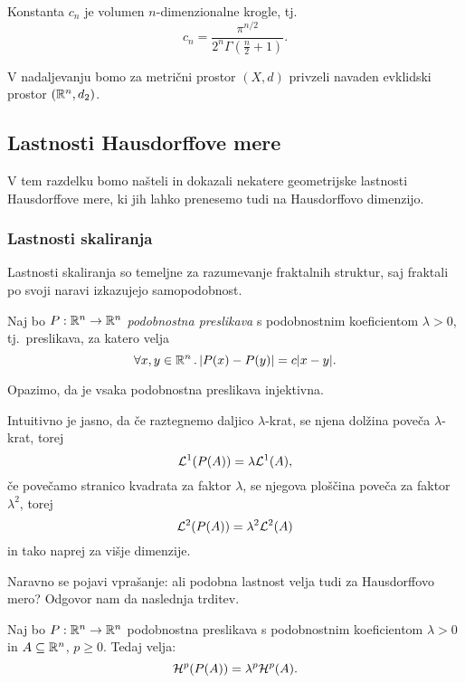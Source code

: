 \begin{opomba}
    Konstanta \(c_n\) je volumen \(n\)-dimenzionalne krogle, tj. 
    \[c_n = \frac{\pi^{n/2}}{2^n \Gamma(\frac{n}{2} + 1)}.\]
\end{opomba}

V nadaljevanju bomo za metrični prostor \((X, d)\)  privzeli navaden evklidski prostor \((\mathbb{R}^n, d_2)\).

\subsection{Lastnosti Hausdorffove mere}
V tem razdelku bomo našteli in dokazali nekatere geometrijske lastnosti Hausdorffove mere, ki jih lahko prenesemo tudi na Hausdorffovo dimenzijo.

\subsubsection{Lastnosti skaliranja}
Lastnosti skaliranja so temeljne za razumevanje fraktalnih struktur, saj fraktali po svoji naravi izkazujejo samopodobnost. 

Naj bo \(P: \mathbb{R}^n \to \mathbb{R}^n\) \emph{podobnostna preslikava} s podobnostnim koeficientom \(\lambda > 0\), tj.\ preslikava, za katero velja
\[\forall x, y \in \mathbb{R}^n \,.\, |P(x) - P(y)| = c|x - y|.\]

\begin{opomba}
    Opazimo, da je vsaka podobnostna preslikava injektivna.
\end{opomba}

Intuitivno je jasno, da če raztegnemo daljico \(\lambda\)-krat, se njena dolžina poveča \(\lambda\)-krat, torej 
\[\mathcal{L}^1(P(A)) = \lambda\mathcal{L}^1(A),\]
če povečamo stranico kvadrata za faktor \(\lambda\), se njegova ploščina poveča za faktor \(\lambda^2\), torej 
\[\mathcal{L}^2(P(A)) = \lambda^2\mathcal{L}^2(A)\]
in tako naprej za višje dimenzije.

Naravno se pojavi vprašanje: ali podobna lastnost velja tudi za Hausdorffovo mero? Odgovor nam da naslednja trditev.

\begin{trditev}
    \label{skale}
    Naj bo \(P: \mathbb{R}^n \to \mathbb{R}^n\) podobnostna preslikava s podobnostnim koeficientom \(\lambda > 0\) in \(A \subseteq \mathbb{R}^n\), \(p \geq 0\). Tedaj velja:
    \[\mathcal{H}^p(P(A)) = \lambda^p \mathcal{H}^p(A).\]
\end{trditev}

